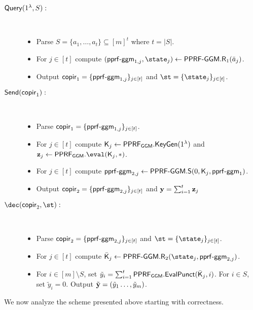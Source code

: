 \begin{description}
\item[$\mathsf{Query}(1^\lambda,S):$]~
\begin{itemize}
    \item Parse $S=\{a_1,\dots, a_t\}\subseteq [m]^t$ where $t=|S|$.
    \item For $j\in[t]$ compute $(\pprfggm_{1,j},\state_j)\leftarrow \PPRFGGM.\Rs_1(\bar a_j)$.
    \item Output $\mathsf{copir}_1=\{\mathsf{pprf}\text{-}\mathsf{ggm}_{1,j}\}_{j\in[t]}$ and $\st=\{\state_j\}_{j\in[t]}$.
\end{itemize}


\item[$\mathsf{Send}(\mathsf{copir}_1):$]~
\begin{itemize}
    \item Parse $\mathsf{copir}_1=\{\mathsf{pprf}\text{-}\mathsf{ggm}_{1,j}\}_{j\in[t]}$.
    \item For $j\in[t]$ compute $\mathsf{K}_j\leftarrow\mathsf{PPRF}_\mathsf{GGM}.\mathsf{KeyGen}(1^\lambda)$ and $\zn_j\leftarrow\PPRF_\mathsf{GGM}.\eval(\key_j,\ast)$.
    \item For $j\in[t]$ compute $\mathsf{pprf}\text{-}\mathsf{ggm}_{2,j}\leftarrow\mathsf{PPRF}\text{-}\mathsf{GGM}.\mathsf{S}(0,\mathsf{K}_j,\mathsf{pprf}\text{-}\mathsf{ggm}_1)$.
  \item Output $\mathsf{copir}_2=\{\mathsf{pprf}\text{-}\mathsf{ggm}_{2,j}\}_{j\in[t]}$ and $\mathbf{y}=\sum_{i=1}^t\mathbf{z}_j$

\end{itemize}

\item[$\dec(\copir_2,\st):$]~
\begin{itemize}
    \item Parse $\mathsf{copir}_2=\{\mathsf{pprf}\text{-}\mathsf{ggm}_{2,j}\}_{j\in[t]}$  and $\st=\{\state_j\}_{j\in[t]}$.
    \item For $j\in[t]$ compute $\bar{\key}_j\leftarrow\PPRFGGM.\Rs_2(\state_j,\pprfggm_{2,j})$.
    \item For $i\in[m]\setminus S$, set $\tilde y_i=\sum_{i=1}^t \mathsf{PPRF}_\mathsf{GGM}.\mathsf{EvalPunct}(\bar{\mathsf{K}}_j,i)$. For $i\in S$, set $\tilde y_i=0$. Output $\tilde {\mathbf{y}}=(\tilde y_1\dots, \tilde y_m)$.%
\end{itemize}
\end{description}


We now analyze the scheme presented above starting with correctness.

